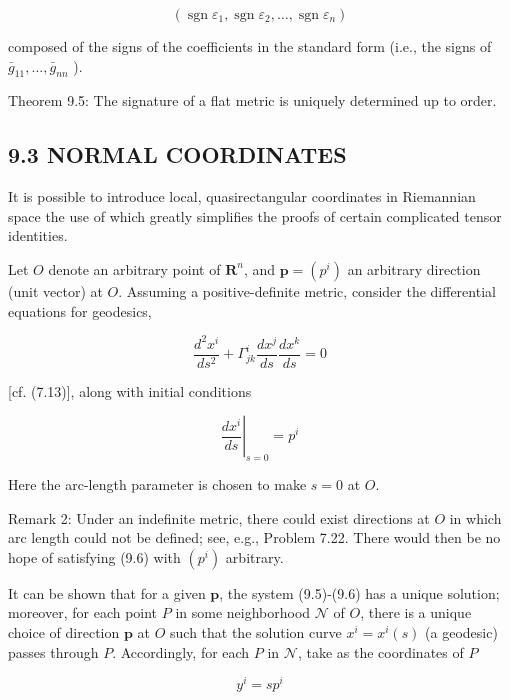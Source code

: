 \documentclass[10pt]{article}
\begin{document}
$$
\left(\operatorname{sgn} \varepsilon_{1}, \operatorname{sgn} \varepsilon_{2}, \ldots, \operatorname{sgn} \varepsilon_{n}\right)
$$

composed of the signs of the coefficients in the standard form (i.e., the signs of $\bar{g}_{11}, \ldots, \bar{g}_{n n}$ ).

Theorem 9.5: The signature of a flat metric is uniquely determined up to order.

\subsection*{9.3 NORMAL COORDINATES}
It is possible to introduce local, quasirectangular coordinates in Riemannian space the use of which greatly simplifies the proofs of certain complicated tensor identities.

Let $O$ denote an arbitrary point of $\mathbf{R}^{n}$, and $\mathbf{p}=\left(p^{i}\right)$ an arbitrary direction (unit vector) at $O$. Assuming a positive-definite metric, consider the differential equations for geodesics,


\begin{equation*}
\frac{d^{2} x^{i}}{d s^{2}}+\Gamma_{j k}^{i} \frac{d x^{j}}{d s} \frac{d x^{k}}{d s}=0 \tag{9.5}
\end{equation*}


[cf. (7.13)], along with initial conditions


\begin{equation*}
\left.\frac{d x^{i}}{d s}\right|_{s=0}=p^{i} \tag{9.6}
\end{equation*}


Here the arc-length parameter is chosen to make $s=0$ at $O$.

Remark 2: Under an indefinite metric, there could exist directions at $O$ in which arc length could not be defined; see, e.g., Problem 7.22. There would then be no hope of satisfying (9.6) with $\left(p^{i}\right)$ arbitrary.

It can be shown that for a given $\mathbf{p}$, the system (9.5)-(9.6) has a unique solution; moreover, for each point $P$ in some neighborhood $\mathcal{N}$ of $O$, there is a unique choice of direction $\mathbf{p}$ at $O$ such that the solution curve $x^{i}=x^{i}(s)$ (a geodesic) passes through $P$. Accordingly, for each $P$ in $\mathcal{N}$, take as the coordinates of $P$


\begin{equation*}
y^{i}=s p^{i} \tag{9.7}
\end{equation*}
\end{document}
